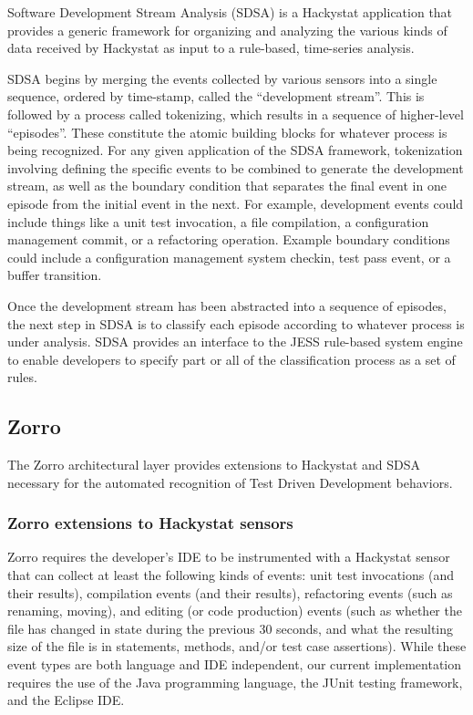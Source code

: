 \documentclass[smallextended]{svjour3}     %
\begin{document}
Software Development Stream Analysis (SDSA) is a Hackystat application that
provides a generic framework for organizing and analyzing the various kinds
of data received by Hackystat as input to a rule-based, time-series
analysis.

SDSA begins by merging the events collected by various sensors into a single sequence, 
ordered by time-stamp, called the ``development stream''.  
This is followed by a process called tokenizing, which results in a 
sequence of higher-level ``episodes''.  These 
constitute the atomic building blocks for whatever process is being
recognized.  For any given application of the SDSA framework, tokenization
involving defining the specific events to be combined to generate the
development stream, as well as the boundary condition that separates the
final event in one episode from the initial event in the next. For example, 
development events could include things like a unit test invocation, a file compilation, a
configuration management commit, or a refactoring operation.  Example
boundary conditions could include a configuration management system checkin, test
pass event, or a buffer transition.

Once the development stream has been abstracted into a sequence of
episodes, the next step in SDSA is to classify each episode according to
whatever process is under analysis.  SDSA provides an interface to the JESS
rule-based system engine to enable developers to specify part or all of the
classification process as a set of rules.

\subsection{Zorro}

The Zorro architectural layer provides extensions to Hackystat and SDSA
necessary for the automated recognition of Test Driven Development
behaviors.

\subsubsection{Zorro extensions to Hackystat sensors}

Zorro requires the developer's IDE to be instrumented with a Hackystat
sensor that can collect at least the following kinds of events: unit test
invocations (and their results), compilation events (and their results),
refactoring events (such as renaming, moving), and editing (or code
production) events (such as whether the file has changed in state during
the previous 30 seconds, and what the resulting size of the file is in
statements, methods, and/or test case assertions).  While these event types
are both language and IDE independent, our current implementation requires
the use of the Java programming language, the JUnit testing framework, and
the Eclipse IDE.
\end{document}
